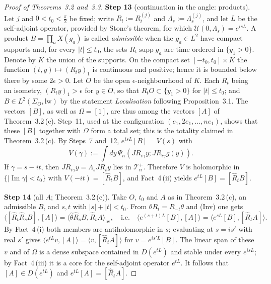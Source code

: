 \documentclass[11pt,letterpaper,reqno]{amsart}
\theoremstyle{definition}
\begin{document}
\begin{proof}[Proof of Theorems~3.2 and~3.3]
\textbf{Step 13} (continuation in the angle: products).
Let $j$ and $0<t_0<\frac\pi2$ be fixed; write $R_t:=R^{(j)}_t$ and $\Lambda_s:=\Lambda^{(j)}_s$, and let $L$ be the self-adjoint operator, provided by Stone's theorem, for which $\mathcal U(0,\Lambda_s)=e^{isL}$.
A product $B=\prod_aX(g_a)$ is called \emph{admissible} when the $g_a\in L^2$ have compact supports and, for every $|t|\le t_0$, the sets $R_t\operatorname{supp}g_a$ are time-ordered in $\{y_1>0\}$.
Denote by $K$ the union of the supports.
On the compact set $[-t_0,t_0]\times K$ the function $(t,y)\mapsto(R_ty)_1$ is continuous and positive; hence it is bounded below there by some $2\epsilon>0$.
Let $O$ be the open $\epsilon$-neighbourhood of $K$.
Each $R_t$ being an isometry, $(R_ty)_1>\epsilon$ for $y\in O$, so that $R_tO\subset\{y_1>0\}$ for $|t|\le t_0$; and $B\in L^2(\Sigma_O,\mathrm{lw})$ by the statement \emph{Localisation} following Proposition~3.1.
The vectors $[B]$, as well as $\Omega=[1]$, are thus among the vectors $[A]$ of Theorem~3.2\,(c).
Step~11, used at the configuration $(e_1,2e_1,\dots,ne_1)$, shows that these $[B]$ together with $\Omega$ form a total set; this is the totality claimed in Theorem~3.2\,(c).
By Steps~7 and~12, $e^{isL}[B]=V(s)$ with
\begin{equation*}
V(\gamma):=\int dy\,\Psi_n(JR_{i\gamma}y;JR_{i\gamma}g(y)).
\end{equation*}
If $\gamma=s-it$, then $JR_{i\gamma}y=\Lambda_sJR_ty$ lies in $\mathcal T_n^+$.
Therefore $V$ is holomorphic in $\{|\operatorname{Im}\gamma|<t_0\}$ with $V(-it)=[\hat R_tB]$, and Fact~4\,(ii) yields $e^{tL}[B]=[\hat R_tB]$.

\textbf{Step 14} (all $A$; Theorem~3.2\,(c)).
Take $O$, $t_0$ and $A$ as in Theorem~3.2\,(c), an admissible $B$, and $s,t$ with $|s|+|t|<t_0$.
From $\theta R_t=R_{-t}\theta$ and (Inv) one gets
\begin{equation*}
\langle[\hat R_t\hat R_sB],[A]\rangle=\langle\hat\theta\hat R_sB,\hat R_tA\rangle_{\mathrm{lw}},\quad\text{i.e.}\quad\langle e^{(s+t)L}[B],[A]\rangle=\langle e^{sL}[B],[\hat R_tA]\rangle.
\end{equation*}
By Fact~4\,(i) both members are antiholomorphic in $s$; evaluating at $s=is'$ with real $s'$ gives $\langle e^{tL}v,[A]\rangle=\langle v,[\hat R_tA]\rangle$ for $v=e^{is'L}[B]$.
The linear span of these $v$ and of $\Omega$ is a dense subspace contained in $D(e^{tL})$ and stable under every $e^{isL}$; by Fact~4\,(iii) it is a core for the self-adjoint operator $e^{tL}$.
It follows that $[A]\in D(e^{tL})$ and $e^{tL}[A]=[\hat R_tA]$.


\end{proof}
\end{document}

